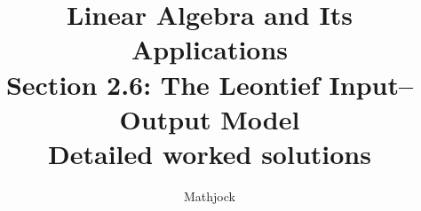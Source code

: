 
\title{\textbf{Linear Algebra and Its Applications}\\[0.3em]Section 2.6: The Leontief Input–Output Model\\[0.3em]\large Detailed worked solutions}
\author{Mathjock}
\date{}

\maketitle
\bookinfo
\tableofcontents
\clearpage
\renewcommand{\thesection}{2.\arabic{section}}
\renewcommand{\theHsection}{2.\arabic{section}}
\setcounter{section}{5}


